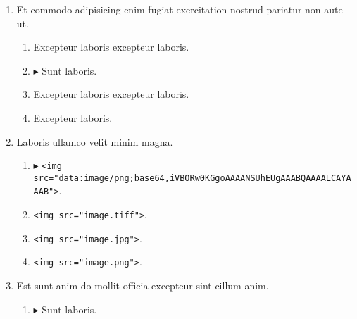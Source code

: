 \documentclass[a4paper,12pt]{article}
\begin{document}
\begin{enumerate}[label=\textbf{\arabic*.}]
\begin{multicols}{2}
\begin{enumerate}
		\item  Excepteur laboris.
    
		\item  Excepteur laboris excepteur laboris.
    
		\item  Excepteur laboris excepteur laboris.
  
	\end{enumerate}

\end{multicols}
\item Et commodo adipisicing enim fugiat exercitation nostrud pariatur non aute ut.
\begin{multicols}{2}
	\begin{enumerate}
		\item  Excepteur laboris excepteur laboris.
    
		\item $\blacktriangleright$  Sunt laboris.
    
		\item  Excepteur laboris excepteur laboris.
  
		\item  Excepteur laboris.
    
	\end{enumerate}

\end{multicols}
\item Laboris ullamco velit minim magna.
	\begin{enumerate}
		\item $\blacktriangleright$  \texttt{<img src="{}data:image/png;base64,iVBORw0KGgoAAAANSUhEUgAAABQAAAALCAYAAAB"{}>}.
    
		\item  \texttt{<img src="{}image.tiff"{}>}.
  
		\item  \texttt{<img src="{}image.jpg"{}>}.
    
		\item  \texttt{<img src="{}image.png"{}>}.
    
	\end{enumerate}

\item Est sunt anim do mollit officia excepteur sint cillum anim.
\begin{multicols}{2}
	\begin{enumerate}
		\item $\blacktriangleright$  Sunt laboris.
    

\end{enumerate}
\end{multicols}
\end{enumerate}
\end{document}
